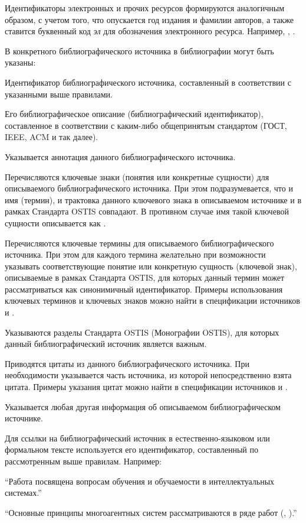 \begin{partbacktext}
Идентификаторы электронных и прочих ресурсов формируются аналогичным образом, с учетом того, что опускается год издания и фамилии авторов, а также ставится буквенный код \textit{эл} для обозначения электронного ресурса. Например, , .

В  конкретного библиографического источника в библиографии могут быть указаны:

\begin{textitemize}
	\item Идентификатор библиографического источника, составленный в соответствии с указанными выше правилами.
	\item Его библиографическое описание (библиографический идентификатор), составленное в соответствии с каким-либо общепринятым стандартом (ГОСТ, IEEE, ACM и так далее).
	\item Указывается аннотация данного библиографического источника.
	\item Перечисляются ключевые знаки (понятия или конкретные сущности) для описываемого библиографического источника. При этом подразумевается, что и имя (термин), и трактовка данного ключевого знака в описываемом источнике и в рамках Стандарта OSTIS совпадают. В противном случае имя такой ключевой сущности описывается как .
	\item Перечисляются ключевые термины для описываемого библиографического источника. При этом для каждого термина желательно при возможности указывать соответствующие понятие или конкретную сущность (ключевой знак), описываемые в рамках Стандарта OSTIS, для которых данный термин может рассматриваться как синонимичный идентификатор. Примеры использования ключевых терминов и ключевых знаков можно найти в спецификации источников  и .
	\item Указываются разделы Стандарта OSTIS (Монографии OSTIS), для которых данный библиографический источник является важным.
	\item Приводятся цитаты из данного библиографического источника. При необходимости указывается часть источника, из которой непосредственно взята цитата. Примеры указания цитат можно найти в спецификации источников  и .
	\item Указывается любая другая информация об описываемом библиографическом источнике.
\end{textitemize}

Для ссылки на библиографический источник в естественно-языковом или формальном тексте используется его идентификатор, составленный по рассмотренным выше правилам. Например: 

\begin{textitemize}
	\item ``Работа  посвящена вопросам обучения и обучаемости в интеллектуальных системах.''
	\item ``Основные принципы многоагентных систем рассматриваются в ряде работ (, ).''
\end{textitemize}

\end{partbacktext}

